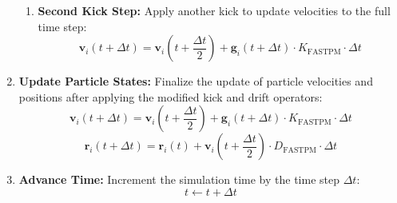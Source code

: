 \begin{enumerate}
\begin{enumerate}
        \item \textbf{Second Kick Step:}
        Apply another kick to update velocities to the full time step:
        \[
        \mathbf{v}_i(t + \Delta t) = \mathbf{v}_i\left(t + \frac{\Delta t}{2}\right) + \mathbf{g}_i(t + \Delta t) \cdot K_{\text{FASTPM}} \cdot \Delta t
        \]
    \end{enumerate}
    
    \item \textbf{Update Particle States:}
    Finalize the update of particle velocities and positions after applying the modified kick and drift operators:
    \[
    \mathbf{v}_i(t + \Delta t) = \mathbf{v}_i\left(t + \frac{\Delta t}{2}\right) + \mathbf{g}_i(t + \Delta t) \cdot K_{\text{FASTPM}} \cdot \Delta t
    \]
    \[
    \mathbf{r}_i(t + \Delta t) = \mathbf{r}_i(t) + \mathbf{v}_i\left(t + \frac{\Delta t}{2}\right) \cdot D_{\text{FASTPM}} \cdot \Delta t
    \]
    
    \item \textbf{Advance Time:}
    Increment the simulation time by the time step $\Delta t$:
    \[
    t \leftarrow t + \Delta t
    \]
\end{enumerate}
